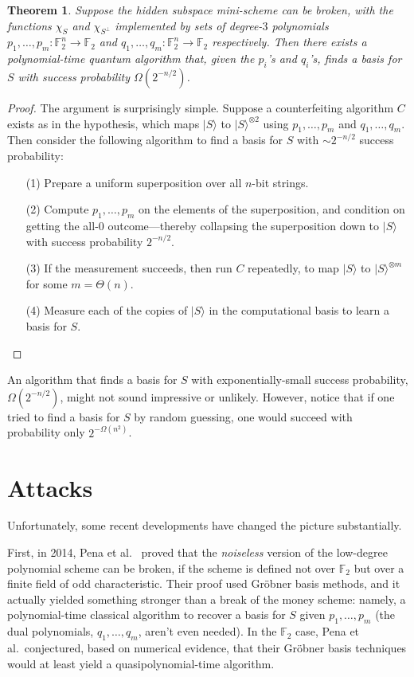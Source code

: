 \documentclass[12pt]{report}
\theoremstyle{plain}
\newtheorem{theorem}{Theorem}[section]
\theoremstyle{definition}
\renewcommand{\ket}[1]{|#1\rangle}
\begin{document}
\begin{theorem}
\label{secreduction}
Suppose the hidden subspace mini-scheme can be broken, with the functions $\chi_S$ and $\chi_{S^\perp}$ implemented by sets of degree-$3$ polynomials $p_1,\ldots,p_m: \mathbb F_2^n\to \mathbb F_2$ and $q_1,\ldots,q_m: \mathbb F_2^n\to \mathbb F_2$ respectively.  Then there exists a polynomial-time quantum algorithm that, given the $p_i$'s and $q_i$'s, finds a basis for $S$ with success probability $\Omega(2^{-n/2})$.
\end{theorem}
\begin{proof}
The argument is surprisingly simple.  Suppose a counterfeiting algorithm $C$ exists as in the hypothesis, which maps $\ket{S}$ to $\ket{S}^{\otimes 2}$ using $p_1,\ldots,p_m$ and $q_1,\ldots,q_m$.  Then consider the following algorithm to find a basis for $S$ with $\sim 2^{-n/2}$ success probability:
\begin{enumerate}
\item[(1)] Prepare a uniform superposition over all $n$-bit strings.
\item[(2)] Compute $p_1,\ldots,p_m$ on the elements of the superposition, and condition on getting the all-$0$ outcome---thereby collapsing the superposition down to $\ket{S}$ with success probability $2^{-n/2}$.
\item[(3)] If the measurement succeeds, then run $C$ repeatedly, to map $\ket{S}$ to $\ket{S}^{\otimes m}$ for some $m=\Theta(n)$.
\item[(4)] Measure each of the copies of $\ket{S}$ in the computational basis to learn a basis for $S$.
\end{enumerate}
\end{proof}

An algorithm that finds a basis for $S$ with exponentially-small success probability, $\Omega(2^{-n/2})$, might not sound impressive or unlikely.  However, notice that if one tried to find a basis for $S$ by random guessing, one would succeed with probability only $2^{-\Omega(n^2)}$.

\section{Attacks}

Unfortunately, some recent developments have changed the picture substantially.

First, in 2014, Pena et al.\ \cite{PFP15} proved that the {\em noiseless} version of the low-degree polynomial scheme can be broken, if the scheme is defined not over $\mathbb{F}_2$ but over a finite field of odd characteristic.  Their proof used Gr\"{o}bner basis methods, and it actually yielded something stronger than a break of the money scheme: namely, a polynomial-time classical algorithm to recover a basis for $S$ given $p_1,\ldots,p_m$ (the dual polynomials, $q_1,\ldots,q_m$, aren't even needed).  In the $\mathbb{F}_2$ case, Pena et al.\ conjectured, based on numerical evidence, that their Gr\"{o}bner basis techniques would at least yield a quasipolynomial-time algorithm.
\end{document}
